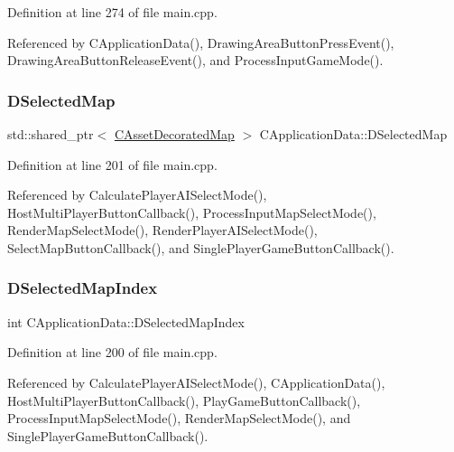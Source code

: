 Definition at line 274 of file main.\+cpp.



Referenced by C\+Application\+Data(), Drawing\+Area\+Button\+Press\+Event(), Drawing\+Area\+Button\+Release\+Event(), and Process\+Input\+Game\+Mode().

\hypertarget{classCApplicationData_abf74a18394e479b7090a8f9a55608867}{}\label{classCApplicationData_abf74a18394e479b7090a8f9a55608867} 
\subsubsection{\texorpdfstring{D\+Selected\+Map}{DSelectedMap}}
{\footnotesize\ttfamily std\+::shared\+\_\+ptr$<$ \hyperlink{classCAssetDecoratedMap}{C\+Asset\+Decorated\+Map} $>$ C\+Application\+Data\+::\+D\+Selected\+Map\hspace{0.3cm}{\ttfamily [protected]}}



Definition at line 201 of file main.\+cpp.



Referenced by Calculate\+Player\+A\+I\+Select\+Mode(), Host\+Multi\+Player\+Button\+Callback(), Process\+Input\+Map\+Select\+Mode(), Render\+Map\+Select\+Mode(), Render\+Player\+A\+I\+Select\+Mode(), Select\+Map\+Button\+Callback(), and Single\+Player\+Game\+Button\+Callback().

\hypertarget{classCApplicationData_a279cfd90004e3f1b90b119358ff25586}{}\label{classCApplicationData_a279cfd90004e3f1b90b119358ff25586} 
\subsubsection{\texorpdfstring{D\+Selected\+Map\+Index}{DSelectedMapIndex}}
{\footnotesize\ttfamily int C\+Application\+Data\+::\+D\+Selected\+Map\+Index\hspace{0.3cm}{\ttfamily [protected]}}



Definition at line 200 of file main.\+cpp.



Referenced by Calculate\+Player\+A\+I\+Select\+Mode(), C\+Application\+Data(), Host\+Multi\+Player\+Button\+Callback(), Play\+Game\+Button\+Callback(), Process\+Input\+Map\+Select\+Mode(), Render\+Map\+Select\+Mode(), and Single\+Player\+Game\+Button\+Callback().

